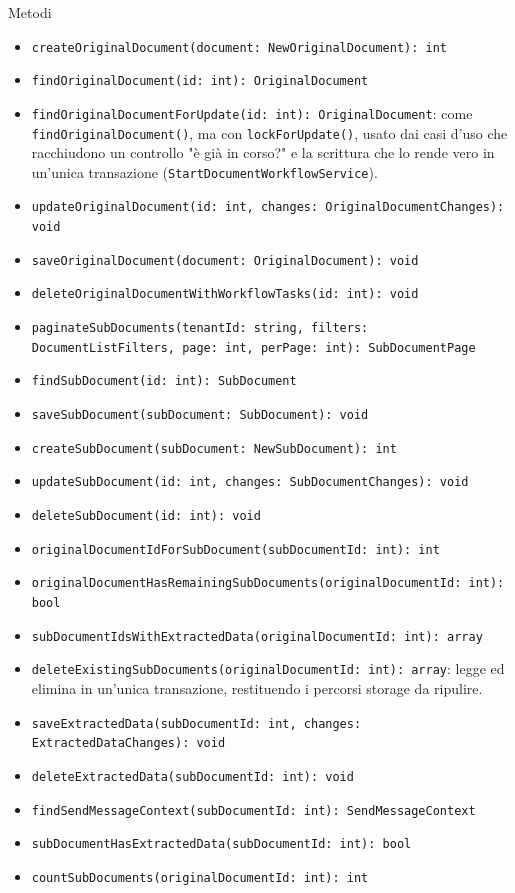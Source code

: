 \documentclass[a4paper,12pt]{article}
\begin{document}
\begin{sloppypar}
Metodi
\begin{itemize}\raggedright
    \item \texttt{createOriginalDocument(document: NewOriginalDocument): int}
    \item \texttt{findOriginalDocument(id: int): OriginalDocument}
    \item \texttt{findOriginalDocumentForUpdate(id: int): OriginalDocument}: come \texttt{findOriginalDocument()}, ma con \texttt{lockForUpdate()}, usato dai casi d'uso che racchiudono un controllo "è già in corso?" e la scrittura che lo rende vero in un'unica transazione (\texttt{StartDocumentWorkflowService}).
    \item \texttt{updateOriginalDocument(id: int, changes: OriginalDocumentChanges): void}
    \item \texttt{saveOriginalDocument(document: OriginalDocument): void}
    \item \texttt{deleteOriginalDocumentWithWorkflowTasks(id: int): void}
    \item \texttt{paginateSubDocuments(tenantId: string, filters: DocumentListFilters, page: int, perPage: int): SubDocumentPage}
    \item \texttt{findSubDocument(id: int): SubDocument}
    \item \texttt{saveSubDocument(subDocument: SubDocument): void}
    \item \texttt{createSubDocument(subDocument: NewSubDocument): int}
    \item \texttt{updateSubDocument(id: int, changes: SubDocumentChanges): void}
    \item \texttt{deleteSubDocument(id: int): void}
    \item \texttt{originalDocumentIdForSubDocument(subDocumentId: int): int}
    \item \texttt{originalDocumentHasRemainingSubDocuments(originalDocumentId: int): bool}
    \item \texttt{subDocumentIdsWithExtractedData(originalDocumentId: int): array}
    \item \texttt{deleteExistingSubDocuments(originalDocumentId: int): array}: legge ed elimina in un'unica transazione, restituendo i percorsi storage da ripulire.
    \item \texttt{saveExtractedData(subDocumentId: int, changes: ExtractedDataChanges): void}
    \item \texttt{deleteExtractedData(subDocumentId: int): void}
    \item \texttt{findSendMessageContext(subDocumentId: int): SendMessageContext}
    \item \texttt{subDocumentHasExtractedData(subDocumentId: int): bool}
    \item \texttt{countSubDocuments(originalDocumentId: int): int}
\end{itemize}


\end{sloppypar}
\end{document}
